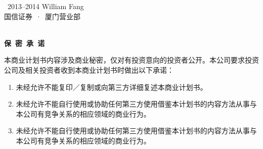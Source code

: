 \thispagestyle{empty}

\noindent\textcopyright\ 2013--2014 William Fang\\
{\kai 国信证券\ ·\ 厦门营业部} {\lmr\textregistered}\\[-2em]
\ \\

\begin{center}
\LARGE\enspace\bfseries{\color{themecolor} 保\ 密\ 承\ 诺} \\
\base{}
\end{center}



本商业计划书内容涉及商业秘密，仅对有投资意向的投资者公开。本公司要求投资公司及相关投资者收到本商业计划书时做出以下承诺：

\begin{enumerate}
\item 未经允许不能复印／复制或向第三方详细复述本商业计划书。
\item 未经允许不能自行使用或协助任何第三方使用借鉴本计划书的内容方法从事与本公司有竞争关系的相应领域的商业行为。
\item 未经允许不能自行使用或协助任何第三方使用借鉴本计划书的内容方法从事与本公司有竞争关系的相应领域的商业行为。
\end{enumerate}

